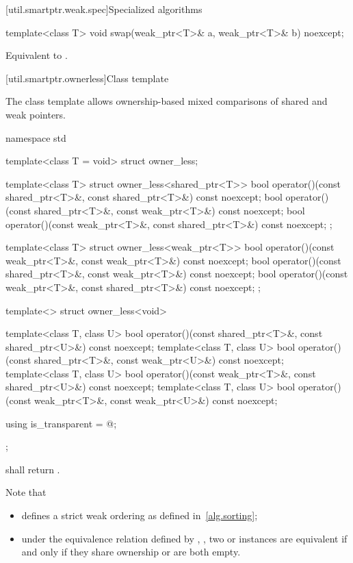 [util.smartptr.weak.spec]{Specialized algorithms}

%
\begin{itemdecl}
template<class T>
  void swap(weak_ptr<T>& a, weak_ptr<T>& b) noexcept;
\end{itemdecl}

\begin{itemdescr}
\pnum
\effects
Equivalent to .
\end{itemdescr}

[util.smartptr.ownerless]{Class template }

\pnum
The class template  allows ownership-based mixed comparisons of shared
and weak pointers.

%
\begin{codeblock}
namespace std {
  template<class T = void> struct owner_less;

  template<class T> struct owner_less<shared_ptr<T>> {
    bool operator()(const shared_ptr<T>&, const shared_ptr<T>&) const noexcept;
    bool operator()(const shared_ptr<T>&, const weak_ptr<T>&) const noexcept;
    bool operator()(const weak_ptr<T>&, const shared_ptr<T>&) const noexcept;
  };

  template<class T> struct owner_less<weak_ptr<T>> {
    bool operator()(const weak_ptr<T>&, const weak_ptr<T>&) const noexcept;
    bool operator()(const shared_ptr<T>&, const weak_ptr<T>&) const noexcept;
    bool operator()(const weak_ptr<T>&, const shared_ptr<T>&) const noexcept;
  };

  template<> struct owner_less<void> {
    template<class T, class U>
      bool operator()(const shared_ptr<T>&, const shared_ptr<U>&) const noexcept;
    template<class T, class U>
      bool operator()(const shared_ptr<T>&, const weak_ptr<U>&) const noexcept;
    template<class T, class U>
      bool operator()(const weak_ptr<T>&, const shared_ptr<U>&) const noexcept;
    template<class T, class U>
      bool operator()(const weak_ptr<T>&, const weak_ptr<U>&) const noexcept;

    using is_transparent = @\unspec@;
  };
}
\end{codeblock}

%
\pnum
{} shall return .
\begin{note}
Note that
\begin{itemize}
\item {} defines a strict weak ordering as defined in~\ref{alg.sorting};

\item under the equivalence relation defined by ,
, two  or
 instances are equivalent if and only if they share ownership or are
both empty.
\end{itemize}
\end{note}

